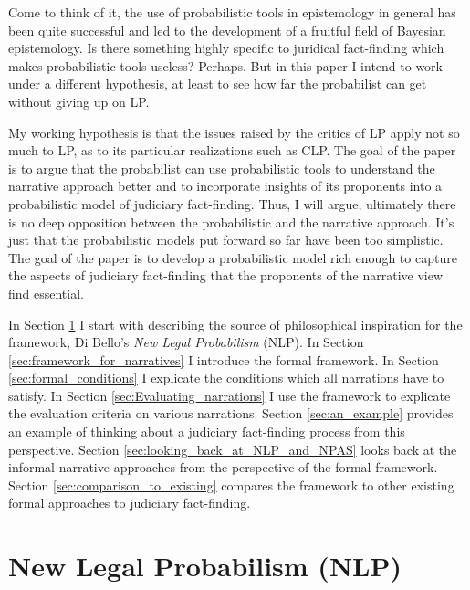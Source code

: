 \documentclass[10pt,leqno]{article}
\begin{document}
   Come to think of it, the use of probabilistic tools in epistemology in general has been quite successful and led to the development of a fruitful field of Bayesian epistemology.    Is there  something highly specific to juridical fact-finding which makes probabilistic tools useless? Perhaps. But in this paper I intend to work under a different hypothesis, at least to see how far the probabilist can get without giving up on LP.

  My working hypothesis is that the issues raised by the critics of LP apply not so much to LP, as to its particular realizations such as CLP. The goal of the paper is to argue that the probabilist can use probabilistic tools to understand the narrative approach better and to incorporate insights of its proponents into a probabilistic model of judiciary fact-finding. Thus, I will argue, ultimately there is no deep opposition between the probabilistic and the narrative approach. It's just that the probabilistic models put forward so far have been too simplistic.  The goal of the paper is to develop a probabilistic model rich enough to capture the aspects of judiciary fact-finding that the proponents of the narrative view find essential.






In Section \ref{sec:NLP} I start with describing the source of philosophical inspiration for the framework, Di Bello's \emph{New Legal Probabilism} (NLP). In Section \ref{sec:framework_for_narratives} I introduce the formal framework. In Section \ref{sec:formal_conditions} I explicate the conditions which all narrations have to satisfy. In Section \ref{sec:Evaluating_narrations} I use the framework to explicate the evaluation criteria on various narrations. Section \ref{sec:an_example} provides an example of thinking about a judiciary fact-finding process from this perspective. Section \ref{sec:looking_back_at_NLP_and_NPAS} looks back at  the informal narrative approaches from the perspective of the formal framework. Section \ref{sec:comparison_to_existing} compares the framework to other existing formal approaches to judiciary fact-finding.




\section{New Legal Probabilism (NLP)} \label{sec:NLP}
\end{document}
